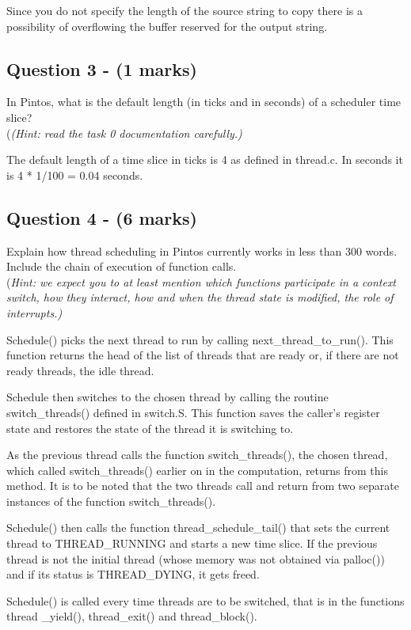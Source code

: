 \documentclass[a4paper,12pt]{article}
\begin{document}
Since you do not specify the length of the source string to copy there is a possibility of overflowing the buffer reserved for the output string.\\

\subsection*{Question 3 - (1 marks)}
In Pintos, what is the default length (in ticks and in seconds) of a scheduler time slice? \\
(\textit{(Hint: read the task 0 documentation carefully.)}

The default length of a time slice in ticks is 4 as defined in thread.c. In seconds it is 4 * 1/100 = 0.04 seconds.\\

\subsection*{Question 4 - (6 marks)}
Explain how thread scheduling in Pintos currently works in less than 300 words. 
Include the chain of execution of function calls. \\
(\textit{Hint: we expect you to at least mention which functions participate in a context switch, how they interact, how and when the thread state is modified, the role of interrupts.)}

Schedule() picks the next thread to run by calling next_thread_to_run(). This function returns the head of the list of threads that are ready or, if there are not ready threads, the idle thread.

Schedule then switches to the chosen thread by calling the routine switch_threads() defined in switch.S. This function saves the caller’s register state and restores the state of the thread it is switching to. 

As the previous thread calls the function switch_threads(), the chosen thread, which called switch_threads() earlier on in the computation, returns from this method. It is to be noted that the two threads call and return from two separate instances of the function switch_threads().

Schedule() then calls the function thread_schedule_tail() that sets the current thread to THREAD_RUNNING and starts a new time slice. If the previous thread is not the initial thread (whose memory was not obtained via palloc()) and if its status is THREAD_DYING, it gets freed.

Schedule() is called every time threads are to be switched, that is in the functions thread _yield(), thread_exit() and thread_block().
\end{document}
